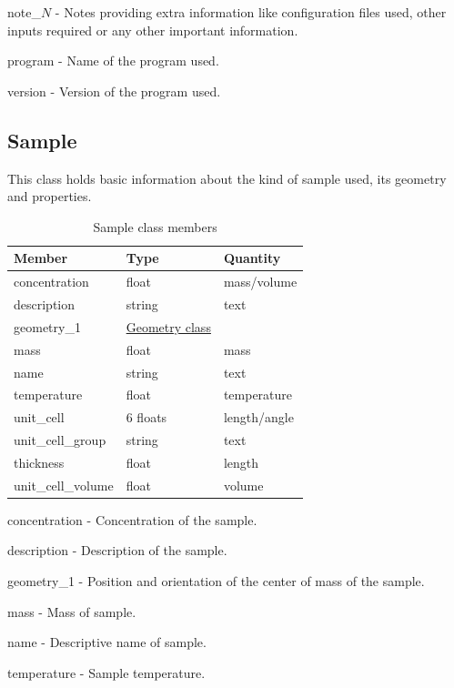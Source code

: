 \documentclass[usletter,11pt]{article}
\newcommand{\member}[2]
{ \noindent
{ \color{softBlue}  #1 - } #2
\vspace{0.2cm}
}
\begin{document}
\member{note\_$N$}{Notes providing extra information like
  configuration files used, other inputs required or any other
  important information.}

\member{program}{Name of the program used.}

\member{version}{Version of the program used.}


\subsection{Sample}
\label{table:sample}

This class holds basic information about the kind of sample used, its
geometry and properties.

\begin{table}[h!]\sffamily \footnotesize
\caption{Sample class members}

\begin{tabular}{p{4.5cm} p{4.5cm}  p{2.5cm} }
\toprule
\bfseries Member     & \bfseries Type & \bfseries Quantity \\
\midrule
concentration & float & mass/volume \\
description & string & text \\
geometry\_1 &  \hyperref[table:geometry]{Geometry class} & \\
mass & float & mass \\
name & string & text \\
temperature     & float & temperature  \\
unit\_cell & 6 floats & length/angle \\
unit\_cell\_group & string & text \\
thickness & float & length \\
unit\_cell\_volume & float & volume \\
\bottomrule
\end{tabular}
\end{table}

\member{concentration}{Concentration of the sample.}

\member{description}{Description of the sample.}

\member{geometry\_1}{Position and orientation of the center of mass of the sample.}

\member{mass}{Mass of sample.}

\member{name}{Descriptive name of sample.}

\member{temperature}{Sample temperature.}
\end{document}
